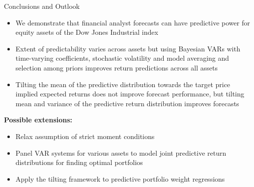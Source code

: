 \documentclass[9pt,xcolor=x11names,compress]{beamer}
\let\natbibcitep\citep
\renewcommand\citep{\bibpunct{(}{)}{;}{a}{,}{;}\natbibcitep}
\theoremstyle{standard}
\theoremstyle{notes}
\begin{document}
\begin{frame}{Conclusions and Outlook}
	\begin{itemize}
		\item We demonstrate that financial analyst forecasts can have predictive power for equity assets of the Dow Jones Industrial index
		\item Extent of predictability varies across assets but using Bayesian VARs with time-varying coefficients, stochastic volatility and model averaging and selection among priors improves return predictions across all assets
		\item Tilting the mean of the predictive distribution towards the target price implied expected returns does not improve forecast performance, but tilting mean and variance of the predictive return distribution improves forecasts
	\end{itemize}
\pause
\textbf{Possible extensions:}
\begin{itemize}
	\item Relax assumption of strict moment conditions
	\item Panel VAR systems for various assets to model joint predictive return distributions for finding optimal portfolios
	\item Apply the tilting framework to predictive portfolio weight regressions \citep{frey2016a}
\end{itemize}
\end{frame}

\end{document}
